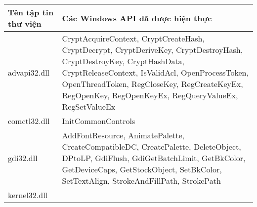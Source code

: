 \begin{longtable}[H]{ | m{3.5cm} | m{10cm} | }

\hline
	Tên tập tin thư viện & Các Windows API đã được hiện thực\\
\hline
\hline

advapi32.dll &
CryptAcquireContext, CryptCreateHash, CryptDecrypt, CryptDeriveKey, CryptDestroyHash, CryptDestroyKey, CryptHashData, CryptReleaseContext, IsValidAcl, OpenProcessToken, OpenThreadToken, RegCloseKey, RegCreateKeyEx, RegOpenKey, RegOpenKeyEx, RegQueryValueEx, RegSetValueEx \\
\hline
comctl32.dll &
InitCommonControls \\
\hline
gdi32.dll &
AddFontResource, AnimatePalette, CreateCompatibleDC, CreatePalette, DeleteObject, DPtoLP, GdiFlush, GdiGetBatchLimit, GetBkColor, GetDeviceCaps, GetStockObject, SetBkColor, SetTextAlign, StrokeAndFillPath, StrokePath \\
\hline
kernel32.dll &

\end{longtable}
